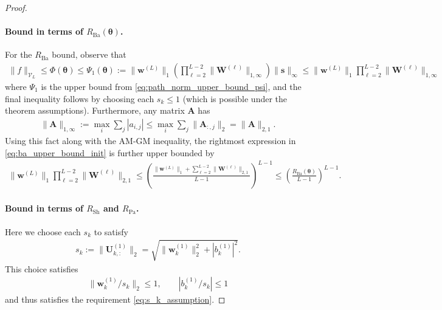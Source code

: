 \documentclass{article}
\def\vtheta{{\bm{\theta}}}
\def\vs{{\bm{s}}}
\def\vw{{\bm{w}}}
\def\mA{{\bm{A}}}
\def\mU{{\bm{U}}}
\def\mW{{\bm{W}}}
\def\cV{{\mathcal{V}}}
\begin{document}
\begin{appendices}
\begin{proof}
    \paragraph{Bound in terms of $R_{\mathrm{Ba}} (\vtheta)$.} For the $R_{\mathrm{Ba}}$ bound, observe that
    \begin{align} \label{eq:ba_upper_bound_init}
        \| f \|_{\cV_L} \leq \Phi(\vtheta) \leq \Psi_1(\vtheta) := \| \vw^{(L)} \|_1 \left( \prod_{\ell=2}^{L-2} \| \mW^{(\ell)} \|_{1,\infty}  \right) \| \vs \|_\infty \leq \| \vw^{(L)} \|_1  \prod_{\ell=2}^{L-2} \| \mW^{(\ell)} \|_{1,\infty} 
    \end{align}
    where $\Psi_1$ is the upper bound from \eqref{eq:path_norm_upper_bound_psi}, and the final inequality follows by choosing each $s_k \leq 1$ (which is possible under the theorem assumptions). Furthermore, any matrix $\mA$ has
    \begin{align}
        \| \mA \|_{1,\infty} := \max_i \sum_j |a_{i,j}| \leq  \max_i \sum_j  \| \mA_{:,j} \|_2 = \| \mA \|_{2,1}.
    \end{align}
    Using this fact along with the AM-GM inequality, the rightmost expression in \eqref{eq:ba_upper_bound_init} is further upper bounded by
    \begin{align}
        \| \vw^{(L)} \|_1  \prod_{\ell=2}^{L-2} \| \mW^{(\ell)} \|_{2,1} \leq \left( \frac{\| \vw^{(L)} \|_1 +  \sum_{\ell=2}^{L-2} \| \mW^{(\ell)} \|_{2,1}}{L-1} \right)^{L-1} \leq \left( \frac{R_{\mathrm{Ba}} (\vtheta)}{L-1} \right)^{L-1}.
    \end{align}
    \paragraph{Bound in terms of $R_{\mathrm{Sh}}$ and $R_{\mathrm{Pa}}$.}
    Here we choose each $s_k$ to satisfy
    \begin{align} \label{eq:choice_sk_sh_pa}
        s_k := \| \mU_{k,:}^{(1)} \|_2 = \sqrt{\| \vw_k^{(1)} \|_2^2 + |b_k^{(1)}|^2}.
    \end{align}
    This choice satisfies
    \begin{align}
        \| \vw_k^{(1)} / s_k \|_2 \leq 1, \qquad |b_k^{(1)}/ s_k | \leq 1
    \end{align}
    and thus satisfies the requirement \eqref{eq:s_k_assumption}. 
    

\end{proof}
\end{appendices}
\end{document}

